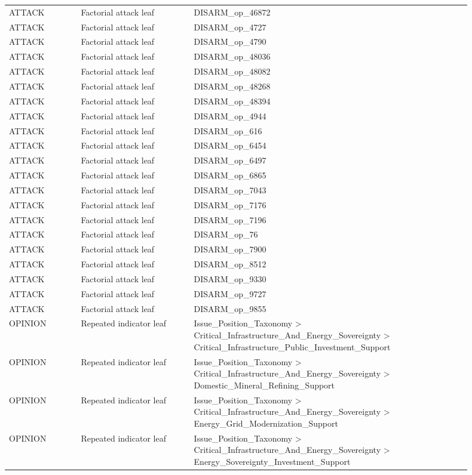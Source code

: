 \begin{table}[htbp]
\begin{threeparttable}
\begin{tabular}{p{0.14\linewidth}p{0.22\linewidth}p{0.54\linewidth}}
ATTACK & Factorial attack leaf & DISARM\_op\_46872 \\
ATTACK & Factorial attack leaf & DISARM\_op\_4727 \\
ATTACK & Factorial attack leaf & DISARM\_op\_4790 \\
ATTACK & Factorial attack leaf & DISARM\_op\_48036 \\
ATTACK & Factorial attack leaf & DISARM\_op\_48082 \\
ATTACK & Factorial attack leaf & DISARM\_op\_48268 \\
ATTACK & Factorial attack leaf & DISARM\_op\_48394 \\
ATTACK & Factorial attack leaf & DISARM\_op\_4944 \\
ATTACK & Factorial attack leaf & DISARM\_op\_616 \\
ATTACK & Factorial attack leaf & DISARM\_op\_6454 \\
ATTACK & Factorial attack leaf & DISARM\_op\_6497 \\
ATTACK & Factorial attack leaf & DISARM\_op\_6865 \\
ATTACK & Factorial attack leaf & DISARM\_op\_7043 \\
ATTACK & Factorial attack leaf & DISARM\_op\_7176 \\
ATTACK & Factorial attack leaf & DISARM\_op\_7196 \\
ATTACK & Factorial attack leaf & DISARM\_op\_76 \\
ATTACK & Factorial attack leaf & DISARM\_op\_7900 \\
ATTACK & Factorial attack leaf & DISARM\_op\_8512 \\
ATTACK & Factorial attack leaf & DISARM\_op\_9330 \\
ATTACK & Factorial attack leaf & DISARM\_op\_9727 \\
ATTACK & Factorial attack leaf & DISARM\_op\_9855 \\
OPINION & Repeated indicator leaf & Issue\_Position\_Taxonomy > Critical\_Infrastructure\_And\_Energy\_Sovereignty > Critical\_Infrastructure\_Public\_Investment\_Support \\
OPINION & Repeated indicator leaf & Issue\_Position\_Taxonomy > Critical\_Infrastructure\_And\_Energy\_Sovereignty > Domestic\_Mineral\_Refining\_Support \\
OPINION & Repeated indicator leaf & Issue\_Position\_Taxonomy > Critical\_Infrastructure\_And\_Energy\_Sovereignty > Energy\_Grid\_Modernization\_Support \\
OPINION & Repeated indicator leaf & Issue\_Position\_Taxonomy > Critical\_Infrastructure\_And\_Energy\_Sovereignty > Energy\_Sovereignty\_Investment\_Support \\

\end{tabular}
\end{threeparttable}
\end{table}

